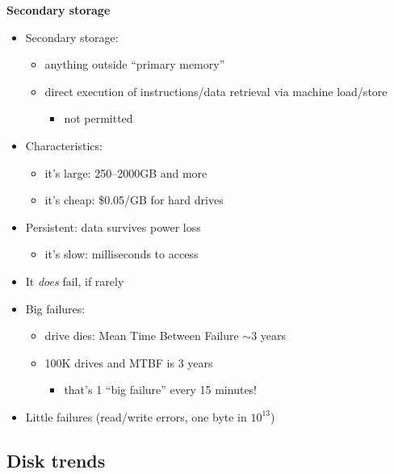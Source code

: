 \documentclass[11pt,a4paper]{article}
\begin{document}
\textbf{Secondary storage}
\begin{itemize}
    \item Secondary storage:
        \begin{itemize}
            \item anything outside ``primary memory''
            \item direct execution of instructions/data retrieval via machine load/store
                \begin{itemize}
                    \item not permitted
                \end{itemize}
        \end{itemize}
    \item Characteristics:
        \begin{itemize}
            \item it's large: 250--2000GB and more
            \item it's cheap: \$0.05/GB for hard drives
        \end{itemize}
    \item Persistent: data survives power loss
        \begin{itemize}
            \item it's slow: milliseconds to access
        \end{itemize}
    \item It \emph{does} fail, if rarely
    \item Big failures:
        \begin{itemize}
            \item drive dies: Mean Time Between Failure $\sim$3 years
            \item 100K drives and MTBF is 3 years
                \begin{itemize}
                    \item that's 1 ``big failure'' every 15 minutes!
                \end{itemize}
        \end{itemize}
    \item Little failures (read/write errors, one byte in $10^{13}$)
\end{itemize}

\subsection{Disk trends}
\end{document}
